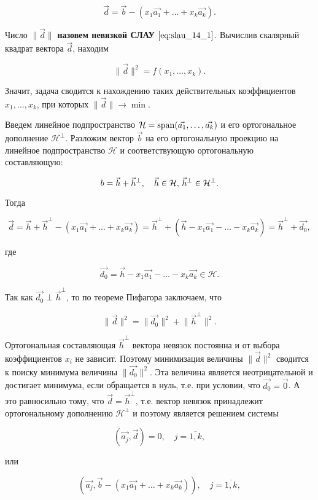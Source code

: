 $$\vec{d} = \vec{b} - (x_1\vec{a_1} + \ldots + x_k\vec{a_k}).$$

Число $\lVert \vec{d} \rVert$ \textbf{назовем невязкой СЛАУ} $\eqref{eq:slau_14_1}$. Вычислив скалярный квадрат вектора $\vec{d}$, находим

$$\lVert \vec{d} \rVert^2 = f(x_1, \ldots, x_k).$$

Значит, задача сводится к нахождению таких действительных коэффициентов $x_1, \ldots, x_k$, при которых $\lVert \vec{d} \rVert \to \min$.

Введем линейное подпространство $\mathcal{H} = \operatorname{\mathop{\mathrm{span}}}(\vec{a_1}, \ldots, \vec{a_k})$ и его ортогональное дополнение $\mathcal{H}^\perp$. Разложим вектор $\vec{b}$ на его ортогональную проекцию на линейное подпространство $\mathcal{H}$ и соответствующую ортогональную составляющую:

$$b = \vec{h} + \vec{h}^\perp, \quad \vec{h} \in \mathcal{H}, \thinspace \vec{h}^\perp \in \mathcal{H}^\perp.$$

Тогда

$$\vec{d} = \vec{h} + \vec{h}^\perp - (x_1\vec{a_1} + \ldots + x_k\vec{a_k}) = \vec{h}^\perp + (\vec{h} - x_1\vec{a_1} - \ldots - x_k\vec{a_k}) = \vec{h}^\perp + \vec{d_0},$$

где

$$\vec{d_0} = \vec{h} - x_1\vec{a_1} - \ldots - x_k\vec{a_k} \in \mathcal{H}.$$

Так как $\vec{d_0} \perp \vec{h}^\perp$, то по теореме Пифагора заключаем, что

$$\lVert \vec{d} \rVert^2 = \lVert \vec{d_0} \rVert^2 + \lVert \vec{h}^\perp \rVert^2.$$

Ортогональная составляющая $\vec{h}^\perp$ вектора невязок постоянна и от выбора коэффициентов $x_i$ не зависит. Поэтому минимизация величины $\lVert \vec{d} \rVert^2$ сводится к поиску минимума величины $\lVert \vec{d_0} \rVert^2$. Эта величина является неотрицательной и достигает минимума, если обращается в нуль, т.е. при условии, что $\vec{d_0} = \vec{0}$. А это равносильно тому, что $\vec{d} = \vec{h}^\perp$, т.е. вектор невязок принадлежит ортогональному дополнению $\mathcal{H}^\perp$ и поэтому является решением системы

\begin{equation}
    (\vec{a_j}, \vec{d}) = 0, \quad j = \overline{1, k},
    \label{eq:slau_14_2}
\end{equation}

или

$$(\vec{a_j}, \vec{b} - (x_1\vec{a_1} + \ldots + x_k\vec{a_k})), \quad j = \overline{1, k},$$

